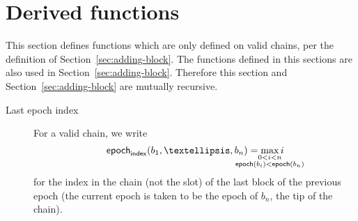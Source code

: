 \documentclass{article}
\newcommand{\epoch}[1]{\mathsf{epoch}(#1)}
\newcommand{\epochindex}[1]{\mathsf{epoch}_\mathsf{index}(#1)}
\begin{document}
\section{Derived functions}
\label{sec:derived-functions}

This section defines functions which are only defined on valid chains,
per the definition of Section~\ref{sec:adding-block}. The functions
defined in this sections are also used in
Section~\ref{sec:adding-block}. Therefore this section and
Section~\ref{sec:adding-block} are mutually recursive.

\begin{description}
\item[Last epoch index] For a valid chain, we write
  $$
  \epochindex{b_1,…,b_n} = \max_{\mathclap{\substack{
      0<i<n\\
      \epoch{b_i} < \epoch{b_n}
  }}} i
  $$
  for the index in the chain (not the slot) of the last block of the
  previous epoch (the current epoch is taken to be the epoch of $b_n$,
  the tip of the chain).


\end{description}
\end{document}
